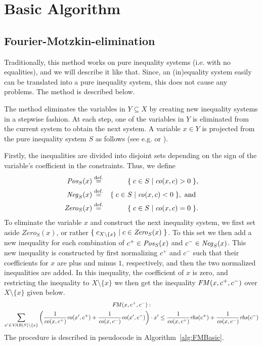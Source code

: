 \section{Basic Algorithm}\label{sec:basic}
\subsection{Fourier-Motzkin-elimination}
Traditionally, this method works on pure inequality systems (i.e. with no equalities), and we will describe it like that. Since, an (in)equality system easily can be translated into a pure inequality system, this does not cause any problems. The method is described below.

The method eliminates the variables in $Y\subseteq X$ by creating new inequality systems in a stepwise fashion. At each step, one of the variables in $Y$ is eliminated from the current system to obtain the next system. A variable $x\in Y$ is projected from the pure inequality system $S$ as follows (see e.g. \cite{imbert93} or \cite{ziegler95}).

Firstly, the inequalities are divided into disjoint sets depending on the sign of the variable's coefficient in the constraints. Thus, we define
\begin{eqnarray*}
\mathit{Pos}_S(x) &\overset{\text{def.}}=& \{\;{c\in S}\;|\;{\mathit{co}(x,c) > 0}\;\},\\
\mathit{Neg}_S(x) &\overset{\text{def.}}=& \{\;{c\in S}\;|\;{\mathit{co}(x,c) < 0}\;\}, \text{ and }\\ 
\mathit{Zero}_S(x) &\overset{\text{def.}}=& \{\;{c\in S}\;|\;{\mathit{co}(x,c) = 0}\;\}.
\end{eqnarray*}
To eliminate the variable $x$ and construct the next inequality system, we first set aside $\mathit{Zero}_S(x)$, or rather $\{\;{c_{X\setminus\{x\}}}\;|\;{c\in \mathit{Zero}_S(x)}\;\}$. To this set we then add a new inequality for each combination of $c^+\in\mathit{Pos}_S(x)$ and $c^-\in\mathit{Neg}_S(x)$. This new inequality is constructed by first normalizing $c^+$ and $c^-$ such that their coefficients for $x$ are plus and minus $1$, respectively, and then the two normalized inequalities are added. In this inequality, the coefficient of $x$ is zero, and restricting the inequality to $X\setminus\{x\}$ we then get
the inequality $\mathit{FM}(x,c^+, c^-)$ over $X\setminus\{x\}$ given below. %
\begin{multline}
\label{eq:FMcomb}
\FMcomb(x,c^+, c^-):\\ 
\sum_{x'\in \VAR(S)\setminus\{x\}} \left(\frac{1}{\coef(x,c^+)}\coef(x',c^+) + \frac{1}{\coef(x,c^-)}\coef(x',c^-)\right)\cdot x'
\leq \frac{1}{\coef(x,c^+)}\rhs(c^+) + \frac{1}{\coef(x,c^-)}\rhs(c^-)
% 
\end{multline}
%
The procedure is described in pseudocode in Algorithm~\ref{alg:FMBasic}.

